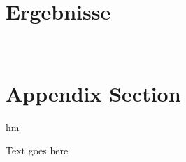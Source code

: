 \documentclass[12pt]{article}
\begin{document}
\section{Ergebnisse}










\newpage~\appendix

\section{Appendix Section}

hm 

Text goes here
\end{document}
